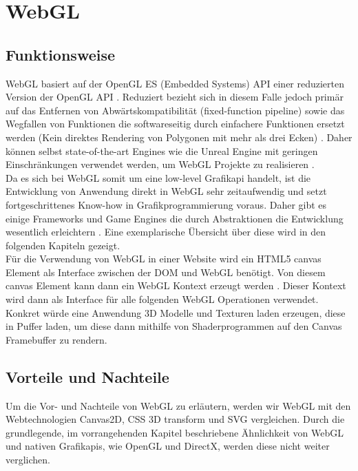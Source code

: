 \section{WebGL}
\subsection{Funktionsweise}
WebGL basiert auf der OpenGL ES (Embedded Systems) API \cite{parisi2012webgl} einer reduzierten Version der OpenGL API \cite{KhronosGLES}. Reduziert bezieht sich in diesem Falle jedoch primär auf das Entfernen von Abwärtskompatibilität (\zb fixed-function pipeline) sowie das Wegfallen von Funktionen die softwareseitig durch einfachere Funktionen ersetzt werden (\zb Kein direktes Rendering von Polygonen mit mehr als drei Ecken) \cite{DiffGLES}. Daher können selbst state-of-the-art Engines wie die Unreal Engine mit geringen Einschränkungen verwendet werden, um WebGL Projekte zu realisieren \cite{UnrealHTML5}\cite{UnrealLimits}. \\
Da es sich bei WebGL somit um eine low-level Grafikapi handelt, ist die Entwicklung von Anwendung direkt in WebGL sehr zeitaufwendig und setzt fortgeschrittenes Know-how in Grafikprogrammierung voraus. Daher gibt es einige Frameworks und Game Engines die durch Abstraktionen die Entwicklung wesentlich erleichtern \cite{parisi2012webgl}. Eine exemplarische Übersicht über diese wird in den folgenden Kapiteln gezeigt. \\
Für die Verwendung von WebGL in einer Website wird ein HTML5 canvas Element als Interface zwischen der \ac{DOM} und WebGL benötigt. Von diesem canvas Element kann dann ein WebGL Kontext erzeugt werden \cite{parisi2012webgl}. Dieser Kontext wird dann als Interface für alle folgenden WebGL Operationen verwendet. Konkret würde eine Anwendung 3D Modelle und Texturen laden \bzw erzeugen, diese in Puffer laden, um diese dann mithilfe von Shaderprogrammen auf den Canvas Framebuffer zu rendern. 
\subsection{Vorteile und Nachteile}
Um die Vor- und Nachteile von WebGL zu erläutern, werden wir WebGL mit den Webtechnologien Canvas2D, CSS 3D transform und SVG vergleichen. Durch die grundlegende, im vorrangehenden Kapitel beschriebene Ähnlichkeit von WebGL und nativen Grafikapis, wie OpenGL und DirectX, werden diese nicht weiter verglichen.

